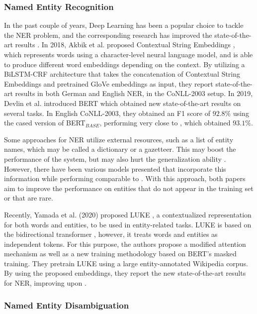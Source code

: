 \documentclass{report}
\theoremstyle{definition}
\theoremstyle{remark}
\begin{document}
\subsubsection{Named Entity Recognition}
In the past couple of years, Deep Learning has been a popular choice to tackle the NER problem, and the corresponding research has improved the state-of-the-art results \cite{NERsurvey}. In 2018, Akbik et al. proposed Contextual String Embeddings \cite{flairpaper}, which represents words using a character-level neural language model, and is able to produce different word embeddings depending on the context. By utilizing a BiLSTM-CRF architecture that takes the concatenation of Contextual String Embeddings and pretrained GloVe embeddings \cite{glove} as input, they report state-of-the-art results in both German and English NER, in the CoNLL-2003 \cite{conll} setup. In 2019, Devlin et al. introduced BERT \cite{BERT} which obtained new state-of-the-art results on several tasks. In English CoNLL-2003, they obtained an F1 score of $92.8\%$ using the cased version of BERT$_{BASE}$\cite{BERT}, performing very close to \cite{flairpaper}, which obtained $93.1\%$.

Some approaches for NER utilize external resources, such as a list of entity names, which may be called a dictionary or a gazetteer. This may boost the performance of the system, but may also hurt the generalization ability \cite{NERsurvey}. However, there have been various models presented \cite{NERgazetteer, NERDict} that incorporate this information while performing comparable to \cite{flairpaper}. With this approach, both papers \cite{NERgazetteer, NERDict} aim to improve the performance on entities that do not appear in the training set or that are rare. 

Recently, Yamada et al. (2020) proposed LUKE \cite{LUKE}, a contextualized representation for both words and entities, to be used in entity-related tasks. LUKE is based on the bidirectional transformer \cite{transformer}, however, it treats words and entities as independent tokens. For this purpose, the authors propose a modified attention mechanism as well as a new training methodology based on BERT's \cite{BERT} masked training. They pretrain LUKE using a large entity-annotated Wikipedia corpus. By using the proposed embeddings, they report the new state-of-the-art results for NER, improving upon \cite{flairpaper}.

\subsubsection{Named Entity Disambiguation}
\end{document}
